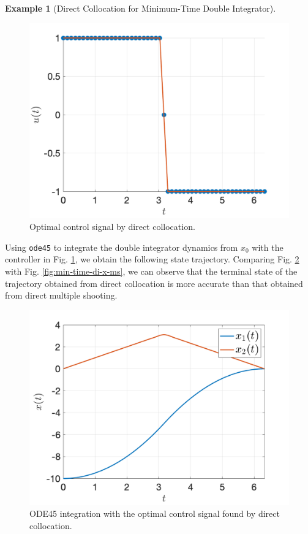 \documentclass[
]{book}
\theoremstyle{definition}
\theoremstyle{definition}
\newtheorem{example}{Example}[chapter]
\theoremstyle{definition}
\theoremstyle{definition}
\theoremstyle{remark}
\begin{document}
\begin{example}[Direct Collocation for Minimum-Time Double Integrator]
\begin{figure}
{\centering \includegraphics[width=0.7\linewidth]{images/min_time_di_u_collocation} 

}

\caption{Optimal control signal by direct collocation.}\label{fig:min-time-di-u-collocation}
\end{figure}

Using \texttt{ode45} to integrate the double integrator dynamics from \(x_0\) with the controller in Fig. \ref{fig:min-time-di-u-collocation}, we obtain the following state trajectory. Comparing Fig. \ref{fig:min-time-di-x-collocation} with Fig. \ref{fig:min-time-di-x-ms}, we can observe that the terminal state of the trajectory obtained from direct collocation is more accurate than that obtained from direct multiple shooting.

\begin{figure}

{\centering \includegraphics[width=0.7\linewidth]{images/min_time_di_x_collocation} 

}

\caption{ODE45 integration with the optimal control signal found by direct collocation.}\label{fig:min-time-di-x-collocation}
\end{figure}


\end{example}
\end{document}
